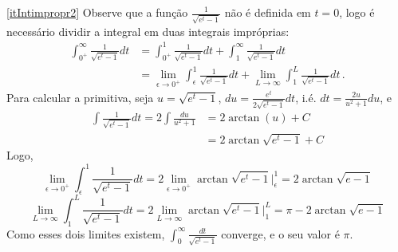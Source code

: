 \begin{Solution}{11.11}
\eqref{itIntimpropr2}
Observe que a função $\frac{1}{\sqrt{e^t-1}}$ não é definida em $t=0$, logo é
necessário dividir a integral em duas integrais impróprias:
\begin{align*}
\int_{0^+}^\infty\frac{1}{\sqrt{e^t-1}}dt&=\int_{0^+}^1\frac{1}{\sqrt{e^t-1}}
dt+\int_1^\infty\frac{1}{\sqrt{e^t-1}}dt\\
&=\lim_{\epsilon\to 0^+}\int_\epsilon^1\frac{1}{\sqrt{e^t-1}}dt+\lim_{L\to
\infty}\int_1^L\frac{1}{\sqrt{e^t-1}}dt\,.
\end{align*}
Para calcular a primitiva, seja $u=\sqrt{e^t-1}$,
$du=\frac{e^t}{2\sqrt{e^t-1}}dt$, i.é. $dt=\frac{2u}{u^2+1}du$, e
\begin{align*}
\int\frac{1}{\sqrt{e^t-1}}dt=2\int\frac{du}{u^2+1} &=2\arctan (u)+C\\
&=2\arctan\sqrt{e^t-1}+C
\end{align*}
Logo,
$$\lim_{\epsilon\to
0^+}\int_\epsilon^1\frac{1}{\sqrt{e^t-1}}dt=2\lim_{\epsilon\to
0^+}\arctan\sqrt{e^t-1}\big|_\epsilon^1=2\arctan\sqrt{e-1}$$
$$\lim_{L\to \infty}\int_1^L\frac{1}{\sqrt{e^t-1}}dt=2\lim_{L\to
\infty}\arctan\sqrt{e^t-1}\big|_1^L=\pi-2\arctan\sqrt{e-1}$$
Como esses dois limites existem,
$\int_0^\infty\frac{dt}{\sqrt{e^t-1}}$ {converge, e o seu valor é
$\pi$}.
\end{Solution}
